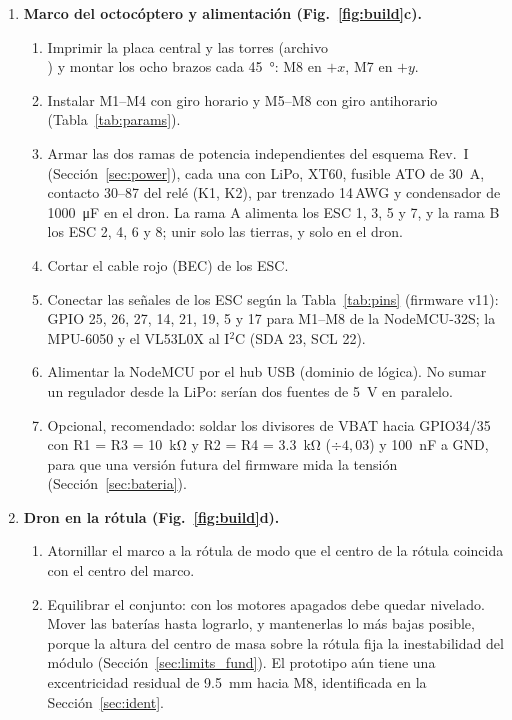 \begin{enumerate}[label=\textbf{Paso \arabic*.}, leftmargin=*, align=left]
  \item \textbf{Marco del octocóptero y alimentación (Fig.~\ref{fig:build}c).}
  \begin{enumerate}[label=(\alph*)]
    \item Imprimir la placa central y las torres (archivo\\ ) y montar los ocho brazos cada \SI{45}{\degree}: M8 en $+x$, M7 en $+y$.
    \item Instalar M1--M4 con giro horario y M5--M8 con giro antihorario (Tabla~\ref{tab:params}).
    \item Armar las dos ramas de potencia independientes del esquema Rev.~I (Sección~\ref{sec:power}), cada una con LiPo, XT60, fusible ATO de \SI{30}{\ampere}, contacto 30--87 del relé (K1, K2), par trenzado 14\,AWG y condensador de \SI{1000}{\micro\farad} en el dron. La rama A alimenta los ESC 1, 3, 5 y 7, y la rama B los ESC 2, 4, 6 y 8; unir solo las tierras, y solo en el dron.
    \item Cortar el cable rojo (BEC) de los ESC.
    \item Conectar las señales de los ESC según la Tabla~\ref{tab:pins} (firmware v11): GPIO 25, 26, 27, 14, 21, 19, 5 y 17 para M1--M8 de la NodeMCU-32S; la MPU-6050 y el VL53L0X al I$^2$C (SDA 23, SCL 22).
    \item Alimentar la NodeMCU por el hub USB (dominio de lógica). No sumar un regulador desde la LiPo: serían dos fuentes de \SI{5}{\volt} en paralelo.
    \item Opcional, recomendado: soldar los divisores de VBAT hacia GPIO34/35 con R1 = R3 = \SI{10}{\kilo\ohm} y R2 = R4 = \SI{3.3}{\kilo\ohm} ($\div4{,}03$) y \SI{100}{\nano\farad} a GND, para que una versión futura del firmware mida la tensión (Sección~\ref{sec:bateria}).
  \end{enumerate}

  \item \textbf{Dron en la rótula (Fig.~\ref{fig:build}d).}
  \begin{enumerate}[label=(\alph*)]
    \item Atornillar el marco a la rótula de modo que el centro de la rótula coincida con el centro del marco.
    \item Equilibrar el conjunto: con los motores apagados debe quedar nivelado. Mover las baterías hasta lograrlo, y mantenerlas lo más bajas posible, porque la altura del centro de masa sobre la rótula fija la inestabilidad del módulo (Sección~\ref{sec:limits_fund}). El prototipo aún tiene una excentricidad residual de \SI{9.5}{\milli\metre} hacia M8, identificada en la Sección~\ref{sec:ident}.
  \end{enumerate}


\end{enumerate}
